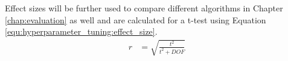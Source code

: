 Effect sizes will be further used to compare different algorithms in Chapter \ref{chap:evaluation} as well and are calculated for a t-test using Equation \ref{equ:hyperparameter_tuning:effect_size}.
\begin{equation}
	\begin{split}
		r & = \sqrt{\frac{t^2}{t^2 + DOF}}
	\end{split}
	 \label{equ:hyperparameter_tuning:effect_size}
\end{equation}




